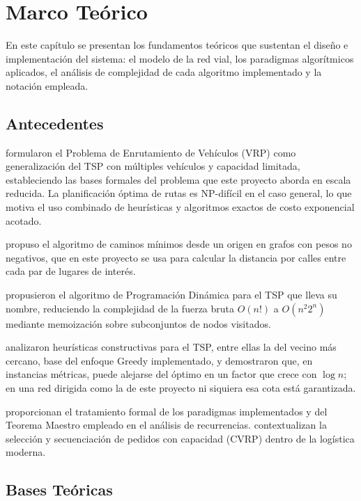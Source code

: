 \chapter{Marco Teórico}

En este capítulo se presentan los fundamentos teóricos que sustentan el diseño e implementación del sistema: el modelo de la red vial, los paradigmas algorítmicos aplicados, el análisis de complejidad de cada algoritmo implementado y la notación empleada.

\section{Antecedentes}

\citet{dantzig1959truck} formularon el Problema de Enrutamiento de Vehículos (VRP) como generalización del TSP con múltiples vehículos y capacidad limitada, estableciendo las bases formales del problema que este proyecto aborda en escala reducida. La planificación óptima de rutas es NP-difícil en el caso general, lo que motiva el uso combinado de heurísticas y algoritmos exactos de costo exponencial acotado.

\citet{dijkstra1959note} propuso el algoritmo de caminos mínimos desde un origen en grafos con pesos no negativos, que en este proyecto se usa para calcular la distancia por calles entre cada par de lugares de interés.

\citet{held1962dynamic} propusieron el algoritmo de Programación Dinámica para el TSP que lleva su nombre, reduciendo la complejidad de la fuerza bruta $O(n!)$ a $O(n^2 2^n)$ mediante memoización sobre subconjuntos de nodos visitados.

\citet{rosenkrantz1977analysis} analizaron heurísticas constructivas para el TSP, entre ellas la del vecino más cercano, base del enfoque Greedy implementado, y demostraron que, en instancias métricas, puede alejarse del óptimo en un factor que crece con $\log n$; en una red dirigida como la de este proyecto ni siquiera esa cota está garantizada.

\citet{cormen2022introduction} proporcionan el tratamiento formal de los paradigmas implementados y del Teorema Maestro empleado en el análisis de recurrencias. \citet{toth2014vehicle} contextualizan la selección y secuenciación de pedidos con capacidad (CVRP) dentro de la logística moderna.

\section{Bases Teóricas}

